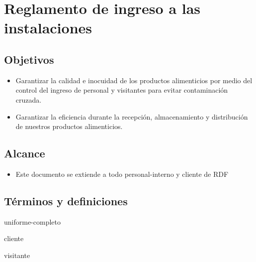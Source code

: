\thispagestyle{formato-PI}
\renewcommand{\MayorVer}{2}
\renewcommand{\MenorVer}{1}
\renewcommand{\Codigo}{BPD-4-CI/CE}
\renewcommand{\FechaPub}{2023--01}
\renewcommand{\Titulo}{Reglamento de ingreso a las instalaciones}

\section{\Titulo}

\subsection{Objetivos}
\begin{itemize}
	\item Garantizar la calidad e inocuidad de los productos alimenticios por medio del control del ingreso de personal y visitantes para evitar contaminación cruzada.
	\item Garantizar la eficiencia durante la recepción, almacenamiento y distribución de nuestros productos alimenticios.
\end{itemize}

\noindent
\subsection{Alcance}
\begin{itemize}	
	\item Este documento se extiende a todo \gls{personal-interno} y \gls{cliente} de \gls{RDF}
\end{itemize}

\subsection{Términos y definiciones}

\begin{description}
	\item[\gls{uniforme-completo}] \glsdesc{uniforme-completo}
	\item[\gls{cliente}] \glsdesc{cliente}
	\item[\gls{visitante}] \glsdesc{visitante}  
\end{description}

